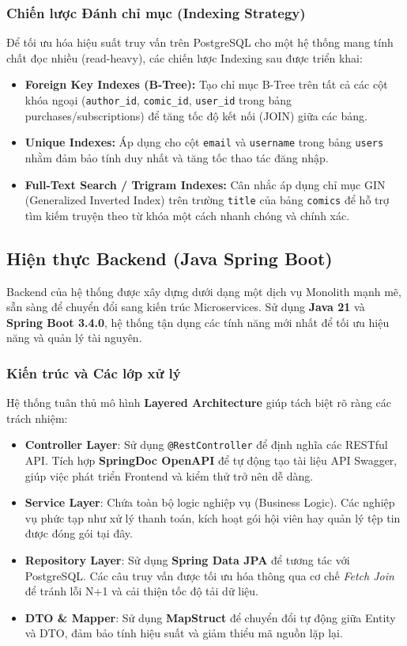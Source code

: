 \subsubsection{Chiến lược Đánh chỉ mục (Indexing Strategy)}
Để tối ưu hóa hiệu suất truy vấn trên PostgreSQL cho một hệ thống mang tính chất đọc nhiều (read-heavy), các chiến lược Indexing sau được triển khai:
\begin{itemize}
    \item \textbf{Foreign Key Indexes (B-Tree):} Tạo chỉ mục B-Tree trên tất cả các cột khóa ngoại (\texttt{author\_id}, \texttt{comic\_id}, \texttt{user\_id} trong bảng purchases/subscriptions) để tăng tốc độ kết nối (JOIN) giữa các bảng.
    \item \textbf{Unique Indexes:} Áp dụng cho cột \texttt{email} và \texttt{username} trong bảng \texttt{users} nhằm đảm bảo tính duy nhất và tăng tốc thao tác đăng nhập.
    \item \textbf{Full-Text Search / Trigram Indexes:} Cân nhắc áp dụng chỉ mục GIN (Generalized Inverted Index) trên trường \texttt{title} của bảng \texttt{comics} để hỗ trợ tìm kiếm truyện theo từ khóa một cách nhanh chóng và chính xác.
\end{itemize}

\subsection{Hiện thực Backend (Java Spring Boot)}
Backend của hệ thống được xây dựng dưới dạng một dịch vụ Monolith mạnh mẽ, sẵn sàng để chuyển đổi sang kiến trúc Microservices. Sử dụng \textbf{Java 21} và \textbf{Spring Boot 3.4.0}, hệ thống tận dụng các tính năng mới nhất để tối ưu hiệu năng và quản lý tài nguyên.

\subsubsection{Kiến trúc và Các lớp xử lý}
Hệ thống tuân thủ mô hình \textbf{Layered Architecture} giúp tách biệt rõ ràng các trách nhiệm:
\begin{itemize}
    \item \textbf{Controller Layer}: Sử dụng \texttt{@RestController} để định nghĩa các RESTful API. Tích hợp \textbf{SpringDoc OpenAPI} để tự động tạo tài liệu API Swagger, giúp việc phát triển Frontend và kiểm thử trở nên dễ dàng.
    \item \textbf{Service Layer}: Chứa toàn bộ logic nghiệp vụ (Business Logic). Các nghiệp vụ phức tạp như xử lý thanh toán, kích hoạt gói hội viên hay quản lý tệp tin được đóng gói tại đây.
    \item \textbf{Repository Layer}: Sử dụng \textbf{Spring Data JPA} để tương tác với PostgreSQL. Các câu truy vấn được tối ưu hóa thông qua cơ chế \textit{Fetch Join} để tránh lỗi N+1 và cải thiện tốc độ tải dữ liệu.
    \item \textbf{DTO \& Mapper}: Sử dụng \textbf{MapStruct} để chuyển đổi tự động giữa Entity và DTO, đảm bảo tính hiệu suất và giảm thiểu mã nguồn lặp lại.
\end{itemize}


